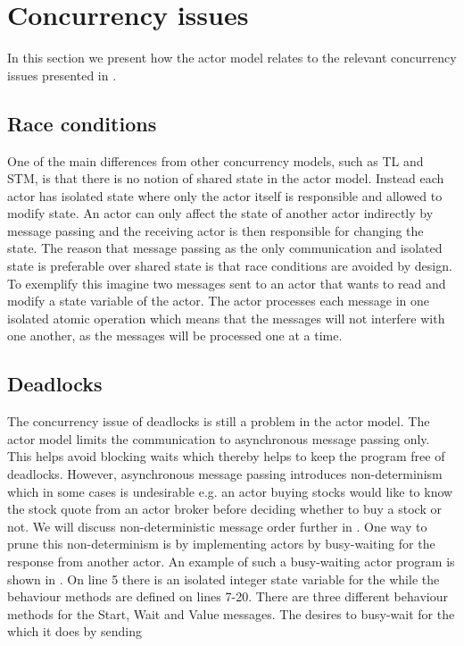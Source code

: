 \section{Concurrency issues}\label{sec:actor_con_issues}
In this section we present how the actor model relates to the relevant concurrency issues presented in .

\subsection{Race conditions}
One of the main differences from other concurrency models, such as \ac{TL} and \ac{STM}, is that there is no notion of shared state in the actor model. Instead each actor has isolated state where only the actor itself is responsible and allowed to modify state. An actor can only affect the state of another actor indirectly by message passing and the receiving actor is then responsible for changing the state. The reason that message passing as the only communication and isolated state is preferable over shared state is that race conditions are avoided by design. To exemplify this imagine two messages sent to an actor that wants to read and modify a state variable of the actor. The actor processes each message in one isolated atomic operation which means that the messages will not interfere with one another, as the messages will be processed one at a time.

\subsection{Deadlocks}\label{ssec:actor_deadlock}
The concurrency issue of deadlocks is still a problem in the actor model. The actor model limits the communication to asynchronous message passing only. This helps avoid blocking waits which thereby helps to keep the program free of deadlocks\cite[p. 304]{tasharofi2013scala}. However, asynchronous message passing introduces non-determinism which in some cases is undesirable e.g. an actor buying stocks would like to know the stock quote from an actor broker before deciding whether to buy a stock or not. We will discuss non-deterministic message order further in . One way to prune this non-determinism is by implementing actors by busy-waiting for the response from another actor. An example of such a busy-waiting actor program is shown in . On line 5 there is an isolated integer state variable for the  while the behaviour methods are defined on lines 7-20. There are three different behaviour methods for the Start, Wait and Value messages. The  desires to busy-wait for the  which it does by sending 


